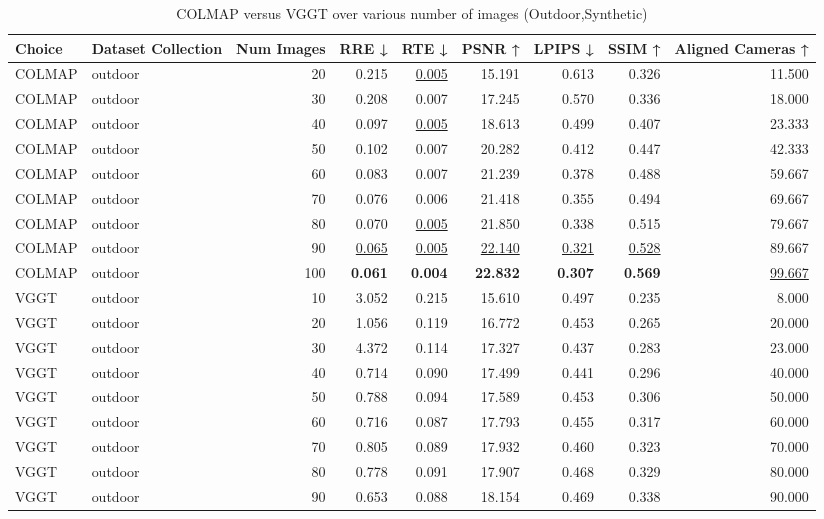 \begin{table}[H]
\caption{\ifdefined\customcaption \customcaption \else COLMAP versus VGGT over various number of images (Outdoor,Synthetic) \fi}
\label{tab:01_num_images_outdoor,synthetic}
\centering
\scriptsize
\begin{tabular}{llrrrrrrr}
\toprule
Choice & Dataset Collection & Num Images & RRE ↓ & RTE ↓ & PSNR ↑ & LPIPS ↓ & SSIM ↑ & Aligned Cameras ↑ \\
\midrule
COLMAP & outdoor & 20 & 0.215 & \underline{0.005} & 15.191 & 0.613 & 0.326 & 11.500 \\
COLMAP & outdoor & 30 & 0.208 & 0.007 & 17.245 & 0.570 & 0.336 & 18.000 \\
COLMAP & outdoor & 40 & 0.097 & \underline{0.005} & 18.613 & 0.499 & 0.407 & 23.333 \\
COLMAP & outdoor & 50 & 0.102 & 0.007 & 20.282 & 0.412 & 0.447 & 42.333 \\
COLMAP & outdoor & 60 & 0.083 & 0.007 & 21.239 & 0.378 & 0.488 & 59.667 \\
COLMAP & outdoor & 70 & 0.076 & 0.006 & 21.418 & 0.355 & 0.494 & 69.667 \\
COLMAP & outdoor & 80 & 0.070 & \underline{0.005} & 21.850 & 0.338 & 0.515 & 79.667 \\
COLMAP & outdoor & 90 & \underline{0.065} & \underline{0.005} & \underline{22.140} & \underline{0.321} & \underline{0.528} & 89.667 \\
COLMAP & outdoor & 100 & \textbf{0.061} & \textbf{0.004} & \textbf{22.832} & \textbf{0.307} & \textbf{0.569} & \underline{99.667} \\
VGGT & outdoor & 10 & 3.052 & 0.215 & 15.610 & 0.497 & 0.235 & 8.000 \\
VGGT & outdoor & 20 & 1.056 & 0.119 & 16.772 & 0.453 & 0.265 & 20.000 \\
VGGT & outdoor & 30 & 4.372 & 0.114 & 17.327 & 0.437 & 0.283 & 23.000 \\
VGGT & outdoor & 40 & 0.714 & 0.090 & 17.499 & 0.441 & 0.296 & 40.000 \\
VGGT & outdoor & 50 & 0.788 & 0.094 & 17.589 & 0.453 & 0.306 & 50.000 \\
VGGT & outdoor & 60 & 0.716 & 0.087 & 17.793 & 0.455 & 0.317 & 60.000 \\
VGGT & outdoor & 70 & 0.805 & 0.089 & 17.932 & 0.460 & 0.323 & 70.000 \\
VGGT & outdoor & 80 & 0.778 & 0.091 & 17.907 & 0.468 & 0.329 & 80.000 \\
VGGT & outdoor & 90 & 0.653 & 0.088 & 18.154 & 0.469 & 0.338 & 90.000 \\

\end{tabular}
\end{table}
